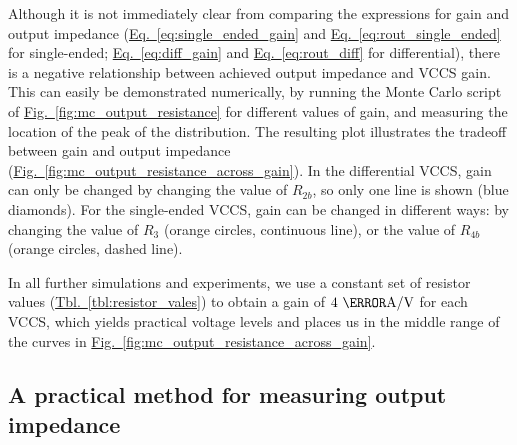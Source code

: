\documentclass[10pt]{article}
\newcommand{\briefeqlink}[1]{\hyperref[#1]{Eq.~\ref*{#1}}\xspace }
\newcommand{\tablelink}[1]{\hyperref[#1]{Tbl.~\ref*{#1}}\xspace }
\newcommand{\brieffiglink}[1]{\hyperref[#1]{Fig.~\ref*{#1}}}
\begin{document}
Although it is not immediately clear from comparing the expressions for gain and output impedance (\briefeqlink{eq:single_ended_gain} and \briefeqlink{eq:rout_single_ended} for single-ended; \briefeqlink{eq:diff_gain} and \briefeqlink{eq:rout_diff} for differential), there is a negative relationship between achieved output impedance and VCCS gain. This can easily be demonstrated numerically, by running the Monte Carlo script of \brieffiglink{fig:mc_output_resistance} for different values of gain, and measuring the location of the peak of the distribution. The resulting plot illustrates the tradeoff between gain and output impedance (\brieffiglink{fig:mc_output_resistance_across_gain}). In the differential VCCS, gain can only be changed by changing the value of $R_{2b}$, so only one line is shown (blue diamonds). For the single-ended VCCS, gain can be changed in different ways: by changing the value of $R_3$ (orange circles, continuous line), or the value of $R_{4b}$ (orange circles, dashed line).

In all further simulations and experiments, we use a constant set of resistor values (\tablelink{tbl:resistor_vales}) to obtain a gain of $4~\milli\ampere/\volt$ for each VCCS, which yields practical voltage levels and places us in the middle range of the curves in \brieffiglink{fig:mc_output_resistance_across_gain}.



\subsection{A practical method for measuring output impedance}
\label{sec:output_impedance_measurement}
\end{document}
